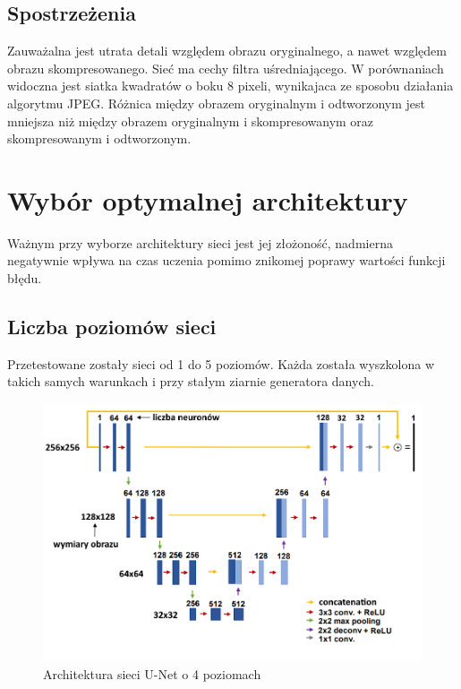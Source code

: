 \documentclass[a4paper,11pt]{article}
\begin{document}
\subsection{Spostrzeżenia}
Zauważalna jest utrata detali względem obrazu oryginalnego, a nawet względem obrazu skompresowanego. Sieć ma cechy filtra uśredniającego.
W porównaniach widoczna jest siatka kwadratów o boku 8 pixeli, wynikajaca ze sposobu działania algorytmu JPEG.
Różnica między obrazem oryginalnym i odtworzonym jest mniejsza niż między obrazem oryginalnym i skompresowanym oraz skompresowanym i odtworzonym.

\section{Wybór optymalnej architektury}
Ważnym przy wyborze architektury sieci jest jej złożoność, nadmierna negatywnie wpływa na czas uczenia pomimo znikomej poprawy wartości funkcji błędu.
\subsection{Liczba poziomów sieci}
Przetestowane zostały sieci od 1 do 5 poziomów. Każda została wyszkolona w takich samych warunkach i przy stałym ziarnie generatora danych.
\begin{figure}[h!]
\begin{center}
	\includegraphics[width=0.9\columnwidth]{unet4.png}
	\caption{Architektura sieci U-Net o 4 poziomach}
\end{center}
\end{figure}
\newpage
\end{document}
